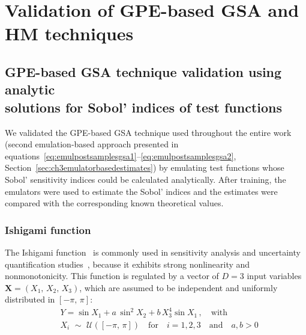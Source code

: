 \chapter{Validation of GPE-based GSA and HM techniques}\label{cha:chapterA}

%
%
%
\section[GPE-based GSA technique validation using analytic solutions for Sobol' indices of test functions]{GPE-based GSA technique validation using analytic\\ solutions for Sobol' indices of test functions}\label{sec:chAGPE-based_GSA_technique_validation_using_analytic_solutions_for_Sobol'_indices_of_test_functions}
We validated the GPE-based GSA technique used throughout the entire work (second emulation-based approach presented in equations~\eqref{eq:emulpostsamplesgsa1}--\eqref{eq:emulpostsamplesgsa2}, Section~\ref{sec:ch3emulatorbasedestimates}) by emulating test functions whose Sobol' sensitivity indices could be calculated analytically. After training, the emulators were used to estimate the Sobol' indices and the estimates were compared with the corresponding known theoretical values.

%
%
%
\subsection{Ishigami function}
The Ishigami function~\cite{Ishigami:1990} is commonly used in sensitivity analysis and uncertainty quantification studies~\cite{Saltelli:2007}, because it exhibits strong nonlinearity and nonmonotonicity. This function is regulated by a vector of $D=3$ input variables $\mathbf{X}=(X_1,\,X_2,\,X_3)$, which are assumed to be independent and uniformly distributed in $[-\pi,\,\pi]$:
%
\begin{align}\label{eq:ishigamifun}
	& Y = \sin{X_1} + a\,\sin^2{X_2} + b\,X_3^4\sin{X_1}\,,\quad\text{with} \\
	& X_i\,\,\sim\,\,\mathcal{U}([-\pi,\,\pi])\quad \text{for}\quad i=1,2,3\quad \text{and}\quad a,b>0
\end{align}

